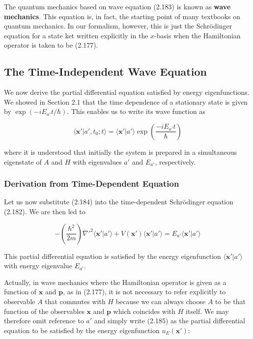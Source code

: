 \documentclass[11pt,a4paper]{article}
\begin{document}
The quantum mechanics based on wave equation (2.183) is known as \textbf{wave mechanics}. This equation is, in fact, the starting point of many textbooks on quantum mechanics. In our formalism, however, this is just the Schrödinger equation for a state ket written explicitly in the $x$-basis when the Hamiltonian operator is taken to be (2.177).

\subsection{The Time-Independent Wave Equation}

We now derive the partial differential equation satisfied by energy eigenfunctions. We showed in Section 2.1 that the time dependence of a stationary state is given by $\exp(-iE_{a'}t/\hbar)$. This enables us to write its wave function as

\begin{equation}
\langle \mathbf{x}'|a', t_0; t\rangle = \langle \mathbf{x}'|a'\rangle \exp\left(\frac{-iE_{a'}t}{\hbar}\right)
\tag{2.184}
\end{equation}

where it is understood that initially the system is prepared in a simultaneous eigenstate of $A$ and $H$ with eigenvalues $a'$ and $E_{a'}$, respectively.

\subsubsection{Derivation from Time-Dependent Equation}

Let us now substitute (2.184) into the time-dependent Schrödinger equation (2.182). We are then led to

\begin{equation}
-\left(\frac{\hbar^2}{2m}\right)\nabla'^2 \langle \mathbf{x}'|a'\rangle + V(\mathbf{x}')\langle \mathbf{x}'|a'\rangle = E_{a'}\langle \mathbf{x}'|a'\rangle
\tag{2.185}
\end{equation}

This partial differential equation is satisfied by the energy eigenfunction $\langle \mathbf{x}'|a'\rangle$ with energy eigenvalue $E_{a'}$.

Actually, in wave mechanics where the Hamiltonian operator is given as a function of $\mathbf{x}$ and $\mathbf{p}$, as in (2.177), it is not necessary to refer explicitly to observable $A$ that commutes with $H$ because we can always choose $A$ to be that function of the observables $\mathbf{x}$ and $\mathbf{p}$ which coincides with $H$ itself. We may therefore omit reference to $a'$ and simply write (2.185) as the partial differential equation to be satisfied by the energy eigenfunction $u_E(\mathbf{x}')$:
\end{document}
